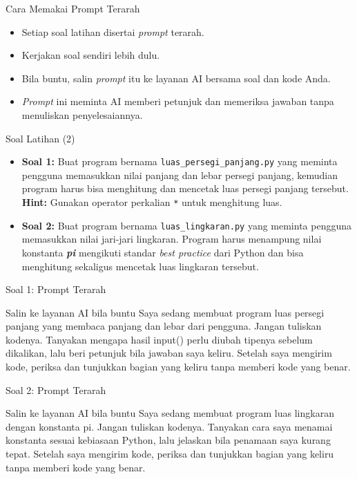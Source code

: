 \documentclass[aspectratio=169, table]{beamer}
\begin{document}
\begin{frame}{Cara Memakai Prompt Terarah}
\begin{itemize}
\item Setiap soal latihan disertai \textit{prompt} terarah.
\item Kerjakan soal sendiri lebih dulu.
\item Bila buntu, salin \textit{prompt} itu ke layanan AI bersama soal dan kode Anda.
\item \textit{Prompt} ini meminta AI memberi petunjuk dan memeriksa jawaban tanpa menuliskan penyelesaiannya.
\end{itemize}
\end{frame}

\begin{frame}[fragile]{Soal Latihan (2)}
\begin{itemize}
\item \textbf{Soal 1:} Buat program bernama \texttt{luas_persegi_panjang.py} yang meminta pengguna memasukkan nilai panjang dan lebar persegi panjang, kemudian program harus bisa menghitung dan mencetak luas persegi panjang tersebut.
\newline \newline
\textbf{Hint:} Gunakan operator perkalian \texttt{*} untuk menghitung luas.

\item \textbf{Soal 2:} Buat program bernama \texttt{luas_lingkaran.py} yang meminta pengguna memasukkan nilai jari-jari lingkaran. Program harus menampung nilai konstanta \textbf{\textit{pi}} mengikuti standar \textit{best practice} dari Python dan bisa menghitung sekaligus mencetak luas lingkaran tersebut.

\end{itemize}
\end{frame}

\begin{frame}{Soal 1: Prompt Terarah}
\begin{block}{Salin ke layanan AI bila buntu}
\small Saya sedang membuat program luas persegi panjang yang membaca panjang dan lebar dari pengguna. Jangan tuliskan kodenya. Tanyakan mengapa hasil input() perlu diubah tipenya sebelum dikalikan, lalu beri petunjuk bila jawaban saya keliru. Setelah saya mengirim kode, periksa dan tunjukkan bagian yang keliru tanpa memberi kode yang benar.
\end{block}
\end{frame}

\begin{frame}{Soal 2: Prompt Terarah}
\begin{block}{Salin ke layanan AI bila buntu}
\small Saya sedang membuat program luas lingkaran dengan konstanta pi. Jangan tuliskan kodenya. Tanyakan cara saya menamai konstanta sesuai kebiasaan Python, lalu jelaskan bila penamaan saya kurang tepat. Setelah saya mengirim kode, periksa dan tunjukkan bagian yang keliru tanpa memberi kode yang benar.
\end{block}
\end{frame}
\end{document}
